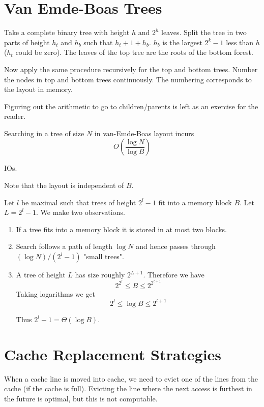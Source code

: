 \section{Van Emde-Boas Trees}

Take a complete binary tree with height $h$ and $2^h$ leaves. Split the tree in two parts of height $h_t$ and $h_b$ such that $h_t +1 + h_b$. $h_b$ is the largest $2^k-1$ less than $h$ ($h_t$ could be zero). The leaves of the top tree are the roots of the bottom forest. 

Now apply the same procedure recursively for the top and bottom trees. Number the nodes in top and bottom trees continuously. The numbering corresponds to the layout in memory.

Figuring out the arithmetic to go to children/parents is left as an exercise for the reader.

\begin{thm} Searching in a tree of size $N$ in van-Emde-Boas layout incurs 
\[O\left(\frac{\log N}{\log B}\right)\]

IOs.
\end{thm}

Note that the layout is independent of $B$.

\begin{pr} Let $l$ be maximal such that trees of height $2^l-1$ fit into a memory block $B$. Let $L=2^l-1$. We make two observations.
\begin{enumerate}
\item If a tree fits into a memory block it is stored in at most two blocks.
\item Search follows a path of length $\log N$ and hence passes through $(\log N)/(2^{l}-1)$ "small trees".
\item A tree of height $L$ has size roughly $2^{L+1}$. Therefore we have
\[2^{2^l} \leq B \leq 2^{2^{l+1}}\]
Taking logarithms we get 
\[2^l \leq \log B \leq 2^{l+1}\]

Thus $2^l-1= \Theta(\log B)$.
\end{enumerate}
\end{pr}

\section{Cache Replacement Strategies}

When a cache line is moved into cache, we need to evict one of the lines from the cache (if the cache is full). Evicting the line where the next access is furthest in the future is optimal, but this is not computable.


